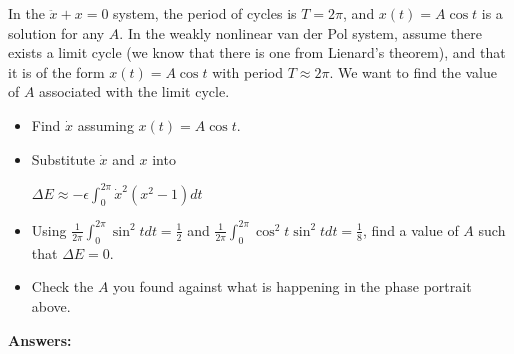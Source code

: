 \documentclass[12pt,letterpaper,noanswers]{exam}
\begin{document}
\begin{questions}
\begin{parts}
In the $\ddot x + x = 0$ system, the period of cycles is $T = 2\pi$, and $x(t) = A\cos t$ is a solution for any $A$.  In the weakly nonlinear van der Pol system, assume there exists a limit cycle (we know that there is one from Lienard's theorem), and that it is of the form $x(t) = A\cos t$ with period $T\approx 2\pi$.  We want to find the value of $A$ associated with the limit cycle.
\begin{itemize}
    \item Find $\dot x$ assuming $x(t) = A\cos t$.
    \item Substitute $\dot x$ and $x$ into 

$\Delta E \approx -\epsilon \int_0^{2\pi} \dot x^2 (x^2-1) dt$

\item  Using $\displaystyle \frac{1}{2\pi} \int_0^{2\pi} \sin^2 t dt = \frac{1}{2}$ and $\displaystyle \frac{1}{2\pi}\int_0^{2\pi} \cos^2 t\sin^2 t dt = \frac{1}{8}$, find a value of $A$ such that $\Delta E = 0$.
\item Check the $A$ you found against what is happening in the phase portrait above.
\end{itemize}




\end{parts}





\end{questions}

\eject

\textbf{Answers:}
\end{document}
